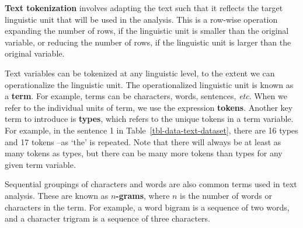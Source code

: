 \documentclass[
  letterpaper,
]{book}
\theoremstyle{definition}
\theoremstyle{remark}
\begin{document}
\textbf{Text tokenization} involves adapting the text such that it
reflects the target linguistic unit that will be used in the analysis.
This is a row-wise operation expanding the number of rows, if the
linguistic unit is smaller than the original variable, or reducing the
number of rows, if the linguistic unit is larger than the original
variable.

Text variables can be tokenized at any linguistic level, to the extent
we can operationalize the linguistic unit. The operationalized
linguistic unit is known as a \textbf{term}. For example, terms can be
characters, words, sentences, \emph{etc}. When we refer to the
individual units of term, we use the expression \textbf{tokens}. Another
key term to introduce is \textbf{types}, which refers to the unique
tokens in a term variable. For example, in the sentence 1 in
Table~\ref{tbl-data-text-dataset}, there are 16 types and 17 tokens --as
`the' is repeated. Note that there will always be at least as many
tokens as types, but there can be many more tokens than types for any
given term variable.

Sequential groupings of characters and words are also common terms used
in text analysis. These are known as \textbf{\(n\)-grams}, where \(n\)
is the number of words or characters in the term. For example, a word
bigram is a sequence of two words, and a character trigram is a sequence
of three characters.
\end{document}
